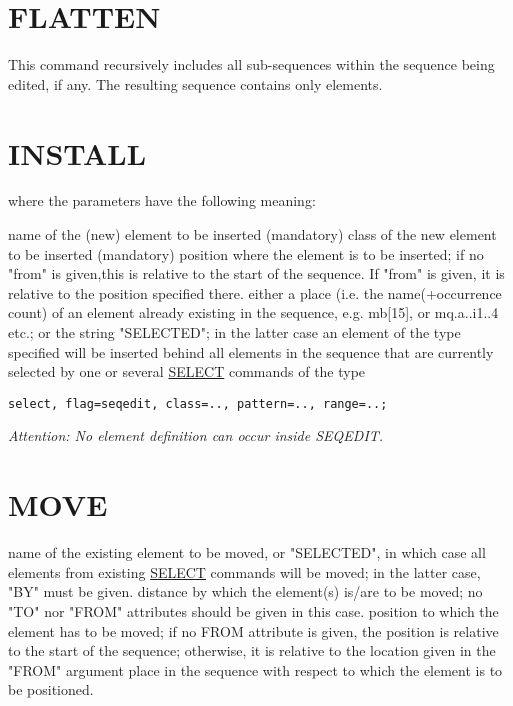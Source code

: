 \section{FLATTEN}
\label{sec:flatten}
This command recursively includes all sub-sequences within the sequence
being edited, if any. The resulting sequence contains only elements.  

\section{INSTALL}
\label{sec:install}
where the parameters have the following meaning: 
\begin{madlist}
    name of the (new) element to be inserted (mandatory) 
    class of the new element to be inserted (mandatory) 
    position where the element is to be inserted; if no "from"
     is given,this is relative to the start of the sequence. If "from"
     is given, it is relative to the position specified there. 
    either a place (i.e. the name(+occurrence count) of an
     element already existing in the sequence, e.g. mb[15], or
     mq.a..i1..4 etc.; or the string "SELECTED"; in the latter case an
     element of the type specified will be inserted behind all elements
     in the sequence that are currently selected by one or several
     \href{../Introduction/select.html}{SELECT} commands of the type 
\begin{verbatim}
select, flag=seqedit, class=.., pattern=.., range=..;
\end{verbatim} 
   \item \textit{Attention: No element definition can occur inside SEQEDIT. }
\end{madlist}

\section{MOVE}
\label{sec:move}
\begin{madlist}
    name of the existing element to be moved, or
     "SELECTED", in which case all elements from existing
     \href{../Introduction/select.html}{SELECT} commands will be moved;
     in the latter case, "BY" must be given.  
    distance by which the element(s) is/are to be moved; no "TO"
     nor "FROM" attributes should be given in this case.  
    position to which the element has to be moved; if no FROM
   attribute is given, the position is relative to the start of the sequence; otherwise, it
     is relative to the location given in the "FROM" argument  
    place in the sequence with respect to which the element
     is to be positioned.  
\end{madlist}

